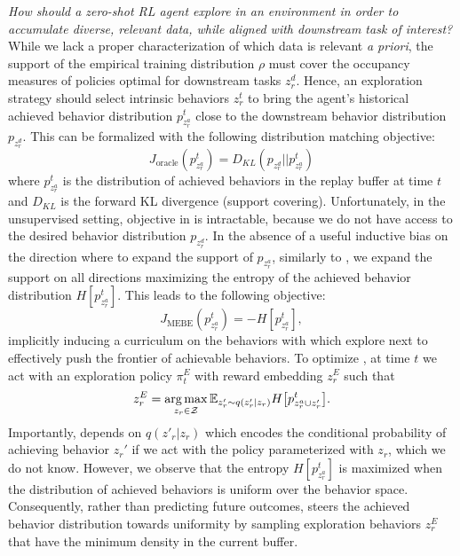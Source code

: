 \textit{How should a zero-shot RL agent explore in an environment in order to accumulate diverse, relevant data, while aligned with downstream task of interest?} While we lack a proper characterization of which data is relevant \textit{a priori}, the support of the empirical training distribution $\rho$ must cover the occupancy measures of policies optimal for downstream tasks $z^d_r$. Hence, an exploration strategy should select intrinsic behaviors $z_r^t$ to bring the agent's historical achieved behavior distribution $p^t_{z^a_r}$ close to the downstream behavior distribution $p_{z^d_r}$. This can be formalized with the following distribution matching objective:
\begin{equation}
\label{eq:oracle_loss}
    J_{\text{oracle}}(p^t_{z^a_r}) = D_{KL}(p_{z^d_r} \vert \vert p^t_{z^a_r})
\end{equation}
where $p^t_{z^a_r}$ is the distribution of achieved behaviors in the replay buffer at time $t$ and $D_{KL}$ is the forward KL divergence (support covering).
Unfortunately, in the unsupervised setting, objective in  is intractable, because we do not have access to the desired behavior distribution $p_{z^d_r}$. In the absence of a useful inductive bias on the direction where to expand the support of $p_{z^a_r}$, similarly to \citet{pitis2020maximum}, we expand the support on all directions maximizing the entropy of the achieved behavior distribution $H[p^t_{z^a_r}]$. This leads to the following objective:
\begin{equation}
\label{eq:entropy_loss}
    J_{\text{MEBE}}(p^t_{z^a_r}) = -H[p^t_{z^a_r}],
\end{equation}
implicitly inducing a curriculum on the behaviors with which explore next to effectively push the frontier of achievable behaviors. 
To optimize , at time $t$ we act with an exploration policy $\pi_t^E$ %
with reward embedding $z_r^{E}$ such that
\begin{equation}
\label{eq:z_mebe}
    z_r^{E} = \operatorname*{arg\,max}_{z_{r} \in {\mathcal{Z}}}\mathbb{E}_{z'_r \sim q(z'_r \vert z_r)} H\big[p^t_{z^a_r \cup z'_r}\big].
\end{equation} 
Importantly,  depends on $q(z'_r \vert z_r)$ which encodes the conditional probability of achieving behavior $z_r'$ if we act with the policy parameterized with $z_r$, which we do not know. However, we observe that the entropy $H[p^t_{z^a_r}]$ is maximized when the distribution of achieved behaviors is uniform over the behavior space. Consequently, rather than predicting future outcomes, \method steers the achieved behavior distribution towards uniformity by sampling exploration behaviors $z_r^E$ that have the minimum density in the current buffer.%

